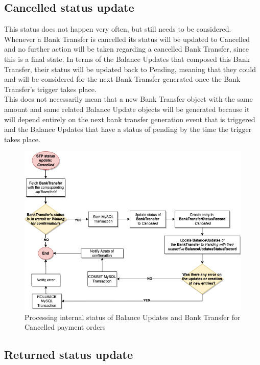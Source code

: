 \subsection{Cancelled status update}

This status does not happen very often, but still needs to be considered. Whenever a Bank Transfer is cancelled its status will be updated to Cancelled and no further action will be taken regarding a cancelled Bank Transfer, since this is a final state. In terms of the Balance Updates that composed this Bank Transfer, their status will be updated back to Pending, meaning that they could and will be considered for the next Bank Transfer generated once the Bank Transfer’s trigger takes place.\\

This does not necessarily mean that a new Bank Transfer object with the same amount and same related Balance Update objects will be generated because it will depend entirely on the next bank transfer generation event that is triggered and the Balance Updates that have a status of pending by the time the trigger takes place.

\begin{figure} [h]
    \centering
    \includegraphics[scale = 0.4]{assets/diagrams/CancelledStatusUpdate.png}
    \caption{Processing internal status of Balance Updates and Bank Transfer for Cancelled payment orders}\label{fig:cancelled_status_update}
\end{figure}

\subsection{Returned status update}


